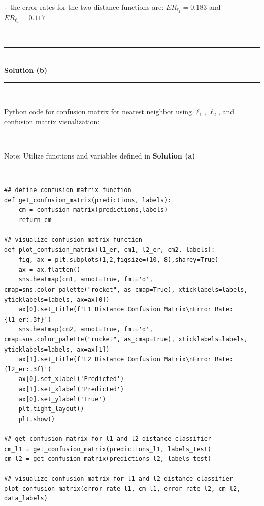 \documentclass{article}
\begin{document}
\parbox{\textwidth}{$\therefore$ the error rates for the two distance functions are: $ER_{\ell_1} = 0.183$ and $ER_{\ell_2} = 0.117$}\\

\noindent\rule{\textwidth}{0.4pt}\\

\textbf{Solution (b)}

\noindent\rule{\textwidth}{0.4pt}\\

\parbox{\textwidth}{Python code for confusion matrix for nearest neighbor using $\ell_1$, $\ell_2$, and confusion matrix visualization:}\\

\parbox{\textwidth}{Note: Utilize functions and variables defined in \textbf{Solution (a)}}\\


\begin{center}

\begin{lstlisting}
## define confusion matrix function
def get_confusion_matrix(predictions, labels):
    cm = confusion_matrix(predictions,labels)
    return cm
  
## visualize confusion matrix function
def plot_confusion_matrix(l1_er, cm1, l2_er, cm2, labels):
    fig, ax = plt.subplots(1,2,figsize=(10, 8),sharey=True)
    ax = ax.flatten()
    sns.heatmap(cm1, annot=True, fmt='d', cmap=sns.color_palette("rocket", as_cmap=True), xticklabels=labels, yticklabels=labels, ax=ax[0])
    ax[0].set_title(f'L1 Distance Confusion Matrix\nError Rate: {l1_er:.3f}')
    sns.heatmap(cm2, annot=True, fmt='d', cmap=sns.color_palette("rocket", as_cmap=True), xticklabels=labels, yticklabels=labels, ax=ax[1])
    ax[1].set_title(f'L2 Distance Confusion Matrix\nError Rate: {l2_er:.3f}')
    ax[0].set_xlabel('Predicted')
    ax[1].set_xlabel('Predicted')
    ax[0].set_ylabel('True')
    plt.tight_layout()
    plt.show()

## get confusion matrix for l1 and l2 distance classifier
cm_l1 = get_confusion_matrix(predictions_l1, labels_test)
cm_l2 = get_confusion_matrix(predictions_l2, labels_test)

## visualize confusion matrix for l1 and l2 distance classifier
plot_confusion_matrix(error_rate_l1, cm_l1, error_rate_l2, cm_l2, data_labels)
\end{lstlisting}
    
\end{center}
\end{document}
